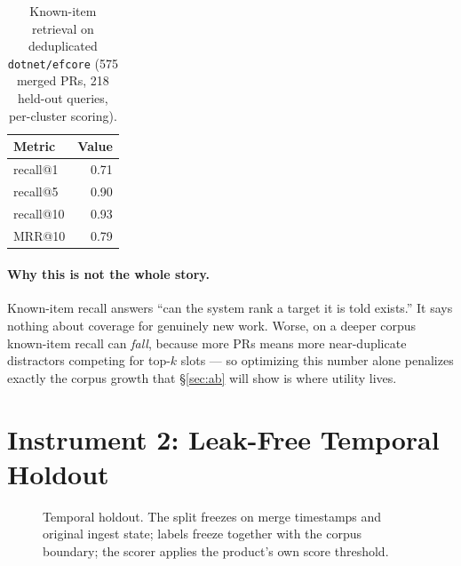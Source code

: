 \documentclass[sigconf,nonacm]{acmart}
\begin{document}
\begin{table}[h]
  \caption{Known-item retrieval on deduplicated \texttt{dotnet/efcore}
  (575 merged PRs, 218 held-out queries, per-cluster scoring).}
  \label{tab:knownitem}
  \begin{tabular}{lr}
    \toprule
    Metric & Value \\
    \midrule
    recall@1 & 0.71 \\
    recall@5 & 0.90 \\
    recall@10 & 0.93 \\
    MRR@10 & 0.79 \\
    \bottomrule
  \end{tabular}
\end{table}

\paragraph{Why this is not the whole story.}
Known-item recall answers ``can the system rank a target it is told
exists.'' It says nothing about coverage for genuinely new work. Worse, on
a deeper corpus known-item recall can \emph{fall}, because more PRs means
more near-duplicate distractors competing for top-$k$ slots --- so
optimizing this number alone penalizes exactly the corpus growth that
\S\ref{sec:ab} will show is where utility lives.

\section{Instrument 2: Leak-Free Temporal Holdout}
\label{sec:temporal}

\begin{figure}[t]
\centering
{}
\caption{Temporal holdout. The split freezes on merge timestamps and
original ingest state; labels freeze together with the corpus boundary;
the scorer applies the product's own score threshold.}
\label{fig:temporal}
\end{figure}
\end{document}
